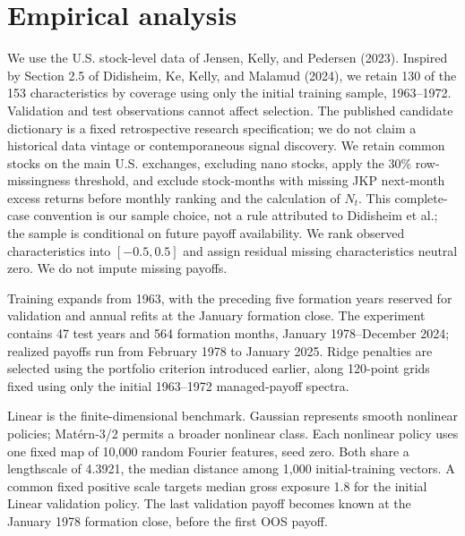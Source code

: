 \section{Empirical analysis}
We use the U.S. stock-level data of Jensen, Kelly, and Pedersen (2023).
Inspired by Section 2.5 of Didisheim, Ke, Kelly, and Malamud (2024), we retain
130 of the 153 characteristics by coverage using only the initial training
sample, 1963--1972. Validation and test observations cannot affect selection.
The published candidate dictionary is a fixed retrospective research specification;
we do not claim a historical data vintage or contemporaneous signal discovery.
We retain common stocks on the main U.S. exchanges, excluding nano stocks,
apply the 30\% row-missingness threshold, and exclude stock-months with missing
JKP next-month excess returns before monthly ranking and the calculation of $N_t$.
This complete-case convention is our sample choice, not a rule attributed to
Didisheim et al.; the sample is conditional on future payoff availability.
We rank observed characteristics into $[-0.5,0.5]$ and assign residual missing
characteristics neutral zero. We do not impute missing payoffs.

Training expands from 1963, with the preceding five formation years reserved
for validation and annual refits at the January formation close. The experiment
contains 47 test years and 564 formation months, January 1978--December 2024;
realized payoffs run from February 1978 to January 2025. Ridge penalties are
selected using the portfolio criterion introduced earlier, along 120-point grids
fixed using only the initial 1963--1972 managed-payoff spectra.

Linear is the finite-dimensional benchmark. Gaussian represents smooth nonlinear
policies; Mat\'ern-3/2 permits a broader nonlinear class. Each nonlinear policy
uses one fixed map of 10,000 random Fourier features, seed zero. Both share
a lengthscale of 4.3921, the median distance among 1,000 initial-training vectors.
A common fixed positive scale targets median gross exposure 1.8 for the initial
Linear validation policy. The last validation payoff becomes known at the
January 1978 formation close, before the first OOS payoff.

